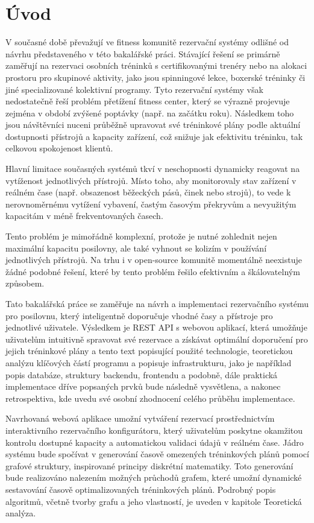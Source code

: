\chapter{Úvod}
\label{sec:Introduction}
V současné době převažují ve fitness komunitě rezervační systémy odlišné od návrhu představeného v této bakalářské práci. Stávající řešení se primárně zaměřují na rezervaci osobních tréninků s certifikovanými trenéry nebo na alokaci prostoru pro skupinové aktivity, jako jsou spinningové lekce, boxerské tréninky či jiné specializované kolektivní programy. Tyto rezervační systémy však nedostatečně řeší problém přetížení fitness center, který se výrazně projevuje zejména v období zvýšené poptávky (např. na začátku roku). Následkem toho jsou návštěvníci nuceni průběžně upravovat své tréninkové plány podle aktuální dostupnosti přístrojů a kapacity zařízení, což snižuje jak efektivitu tréninku, tak celkovou spokojenost klientů.

Hlavní limitace současných systémů tkví v neschopnosti dynamicky reagovat na vytíženost jednotlivých přístrojů\cite{gymmasterManagementSoftware, mindbodyonlineBestFitness, bookywayPrenotazioneUniversale}. Místo toho, aby monitorovaly stav zařízení v reálném čase (např. obsazenost běžeckých pásů, činek nebo strojů), to vede k nerovnoměrnému vytížení vybavení, častým časovým překryvům a nevyužitým kapacitám v méně frekventovaných časech.

Tento problém je mimořádně komplexní, protože je nutné zohlednit nejen maximální kapacitu posilovny, ale také vyhnout se kolizím v používání jednotlivých přístrojů. Na trhu i v open-source komunitě momentálně neexistuje žádné podobné řešení, které by tento problém řešilo efektivním a škálovatelným způsobem.

Tato bakalářská práce se zaměřuje na návrh a implementaci rezervačního systému pro posilovnu, který inteligentně doporučuje vhodné časy a přístroje pro jednotlivé uživatele. Výsledkem je REST API s webovou aplikací, která umožňuje uživatelům intuitivně spravovat své rezervace a získávat optimální doporučení pro jejich tréninkové plány a tento text popisující použité technologie, teoretickou analýzu klíčových částí programu a popisuje infrastrukturu, jako je například popis databáze, struktury backendu, frontendu a podobně, dále praktická implementace dříve popsaných prvků bude následně vysvětlena, a nakonec retrospektiva, kde uvedu své osobní zhodnocení celého průběhu implementace.

Navrhovaná webová aplikace umožní vytváření rezervací prostřednictvím interaktivního rezervačního konfigurátoru, který uživatelům poskytne okamžitou kontrolu dostupné kapacity a automatickou validaci údajů v reálném čase. Jádro systému bude spočívat v generování časově omezených tréninkových plánů pomocí grafové struktury, inspirované principy diskrétní matematiky. Toto generování bude realizováno nalezením možných průchodů grafem, které umožní dynamické sestavování časově optimalizovaných tréninkových plánů. Podrobný popis algoritmů, včetně tvorby grafu a jeho vlastností, je uveden v kapitole Teoretická analýza.
\endinput
